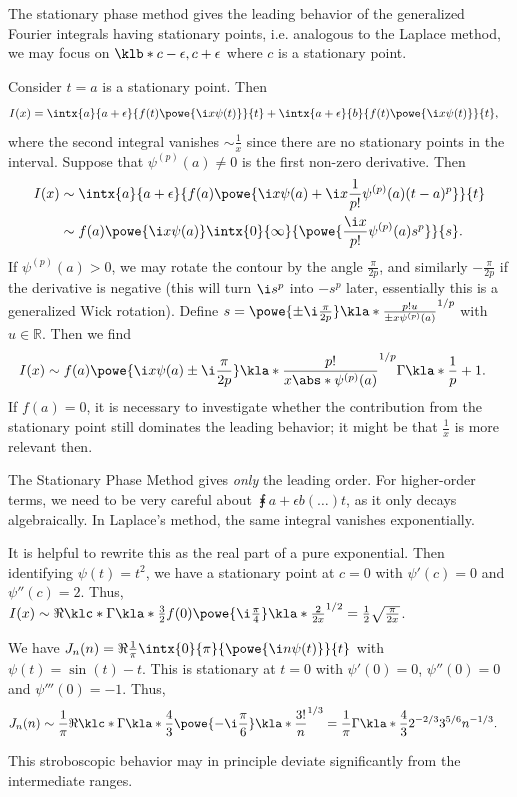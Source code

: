 \documentclass[english, parskip=full]{scrbook}
\newcommand{\definition}[2]{\begin{tcolorbox}[colback=colorbackgrounddefinition,colframe=colordefinition, breakable,enhanced,title=\textbf{#1}.]#2\end{tcolorbox}}
\newcommand{\note}[1]{\begin{tcolorbox}[colback=colorbackgroundnote,colframe=colornote, breakable,enhanced]#1\end{tcolorbox}}
\newcommand{\example}[3]{\begin{tcolorbox}[colback=colorbackgroundexample,colframe=colorexample, breakable,enhanced,title={\textbf{#1}: #2.}]#3\end{tcolorbox}}
\begin{document}
The stationary phase method gives the leading behavior of the generalized Fourier integrals having stationary points, i.e. analogous to the Laplace method, we may focus on $\klb*{c-\epsilon,c+\epsilon}$ where $c$ is a stationary point.
\definition{Stationary Phase Method}{Consider $t=a$ is a stationary point.
Then
\begin{align}
I(x) &= \intx{a}{a+\epsilon}{f(t)\powe{\i x\psi(t)}}{t} + \intx{a+\epsilon}{b}{f(t)\powe{\i x\psi(t)}}{t},
\end{align}
where the second integral vanishes $\sim \frac{1}{x}$ since there are no stationary points in the interval.
Suppose that $\psi^{(p)}(a)\neq 0$ is the first non-zero derivative.
Then
\begin{align}
I(x) &\sim \intx{a}{a+\epsilon}{f(a) \powe{\i x\psi(a) + \i x\frac{1}{p!} \psi^{(p)}(a) (t-a)^p}}{t}\\
&\sim f(a) \powe{\i x\psi(a)} \intx{0}{\infty}{\powe{\frac{\i x}{p!} \psi^{(p)}(a) s^p}}{s}.
\end{align}
If $\psi^{(p)}(a)>0$, we may rotate the contour by the angle $\frac{\pi}{2p}$, and similarly $-\frac{\pi}{2p}$ if the derivative is negative (this will turn $\i s^p$ into $-s^p$ later, essentially this is a generalized Wick rotation).
Define $s=\powe{\pm \i \frac{\pi}{2p}} \kla*{\frac{p! u}{\pm x\psi^{(p)}(a)}}^{1/p}$ with $u\in\mathbb{R}$.
Then we find
\begin{align}
I(x) &\sim f(a) \powe{\i x\psi(a) \pm \i \frac{\pi}{2p}} \kla*{\frac{p!}{x\abs*{\psi^{(p)}(a)}}}^{1/p} \Gamma\kla*{\frac{1}{p}+1}.
\end{align}
If $f(a)=0$, it is necessary to investigate whether the contribution from the stationary point still dominates the leading behavior; it might be that $\frac{1}{x}$ is more relevant then.
\note{The Stationary Phase Method gives \emph{only} the leading order.
For higher-order terms, we need to be very careful about $\intx{a+\epsilon}{b}{(\dots)}{t}$, as it only decays algebraically.
In Laplace's method, the same integral vanishes exponentially. }
}
\example{Quadratic Phase Shift}{$I(x) = \intx{0}{\infty}{\cos\kla*{xt^2-t}}{t}$ as $x\rightarrow\infty$}{It is helpful to rewrite this as the real part of a pure exponential.
Then identifying $\psi(t)=t^2$, we have a stationary point at $c=0$ with $\psi'(c)=0$ and $\psi''(c)=2$.
Thus, $I(x) \sim \Re \klc*{\Gamma\kla*{\frac{3}{2}} f(0) \powe{\i \frac{\pi}{4}} \kla*{\frac{2}{2x}}^{1/2} } = \frac{1}{2} \sqrt{\frac{\pi}{2x}}$.
}
\example{Bessel functions}{$J_n(x) = \frac{1}{\pi} \intx{0}{\pi}{\cos\kla*{x\sin(t) - nt}}{t}$ as $x\rightarrow\infty$}{We have $J_n(n) = \Re \frac{1}{\pi} \intx{0}{\pi}{\powe{\i n\psi(t)}}{t}$ with $\psi(t)=\sin(t)-t$.
This is stationary at $t=0$ with $\psi'(0)=0$, $\psi''(0)=0$ and $\psi'''(0)=-1$.
Thus,
\begin{align}
J_n(n) &\sim \frac{1}{\pi}\Re \klc*{\Gamma\kla*{\frac{4}{3}} \powe{-\i \frac{\pi}{6}} \kla*{\frac{3!}{n}}^{1/3}} = \frac{1}{\pi} \Gamma\kla*{\frac{4}{3}} 2^{-2/3} 3^{5/6} n^{-1/3}.
\end{align}
\note{This stroboscopic behavior may in principle deviate significantly from the intermediate ranges.}
}
\end{document}
